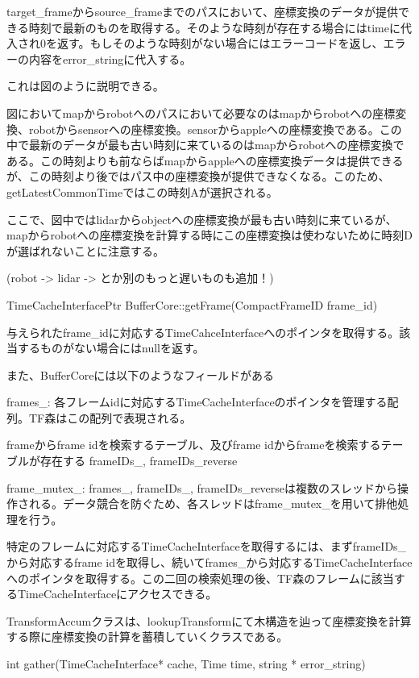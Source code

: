 \documentclass[a4paper]{jreport}	%
\begin{document}
target\_frameからsource\_frameまでのパスにおいて、座標変換のデータが提供できる時刻で最新のものを取得する。そのような時刻が存在する場合にはtimeに代入され0を返す。もしそのような時刻がない場合にはエラーコードを返し、エラーの内容をerror\_stringに代入する。

これは図のように説明できる。

図においてmapからrobotへのパスにおいて必要なのはmapからrobotへの座標変換、robotからsensorへの座標変換。sensorからappleへの座標変換である。この中で最新のデータが最も古い時刻に来ているのはmapからrobotへの座標変換である。この時刻よりも前ならばmapからappleへの座標変換データは提供できるが、この時刻より後ではパス中の座標変換が提供できなくなる。このため、getLatestCommonTimeではこの時刻Aが選択される。

ここで、図中ではlidarからobjectへの座標変換が最も古い時刻に来ているが、mapからrobotへの座標変換を計算する時にこの座標変換は使わないために時刻Dが選ばれないことに注意する。

(robot -> lidar -> とか別のもっと遅いものも追加！)

TimeCacheInterfacePtr BufferCore::getFrame(CompactFrameID frame\_id)

与えられたframe\_idに対応するTimeCahceInterfaceへのポインタを取得する。該当するものがない場合にはnullを返す。

また、BufferCoreには以下のようなフィールドがある



frames\_: 各フレームidに対応するTimeCacheInterfaceのポインタを管理する配列。TF森はこの配列で表現される。




frameからframe idを検索するテーブル、及びframe idからframeを検索するテーブルが存在する frameIDs\_, frameIDs\_reverse

frame\_mutex\_: frames\_, frameIDs\_, frameIDs\_reverseは複数のスレッドから操作される。データ競合を防ぐため、各スレッドはframe\_mutex\_を用いて排他処理を行う。


特定のフレームに対応するTimeCacheInterfaceを取得するには、まずframeIDs\_から対応するframe idを取得し、続いてframes\_から対応するTimeCacheInterfaceへのポインタを取得する。この二回の検索処理の後、TF森のフレームに該当するTimeCacheInterfaceにアクセスできる。

TransformAccumクラスは、lookupTransformにて木構造を辿って座標変換を計算する際に座標変換の計算を蓄積していくクラスである。

int gather(TimeCacheInterface* cache, Time time, string * error\_string)
\end{document}
